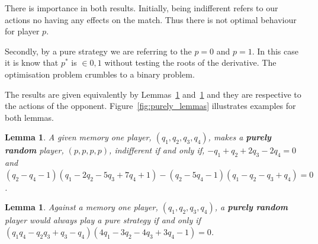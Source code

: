 \documentclass[10pt]{article}
\newtheorem{lemma}[theorem]{Lemma}
\begin{document}
There is importance in both results. Initially, being indifferent refers to our
actions no having any effects on the match. Thus there is not optimal behaviour
for player \(p\).

Secondly, by a pure strategy we are referring to the \(p=0\) and \(p=1\).
In this case it is know that \(p^*\) is \(\in {0, 1}\) without testing the roots
of the derivative. The optimisation problem crumbles to a binary problem.

The results are given equivalently by Lemmas~\ref{lemma:constant} and~\ref{lemma:linear}
and they are respective to the actions of the opponent. Figure~\ref{fig:purely_lemmas}
illustrates examples for both lemmas.

\begin{lemma}\label{lemma:constant}
    A given memory one player, \((q_1, q_2, q_3, q_4)\), makes a \textbf{purely
    random} player, \((p, p, p, p)\), indifferent if and only if,
    \(-q_1 + q_2 + 2q_3 - 2q_4 = 0 \) and
    \((q_2 - q_4 - 1)(q_1 - 2q_2 - 5q_3 + 7q_4 + 1) -(q_2 - 5q_4 - 1)(q_1 - q_2 - q_3 + q_4) = 0 \).
\end{lemma}

\begin{lemma}\label{lemma:linear}
    Against a memory one player, \((q_1, q_2, q_3, q_4)\), a \textbf{purely random}
    player would always play a pure strategy if and only if
    \((q_{1}q_{4} - q_{2} q_{3} + q_{3} - q_{4}) (4 q_{1} - 3 q_{2} - 4 q_{3} + 3
    q_{4} - 1) = 0\).
\end{lemma}
\end{document}
